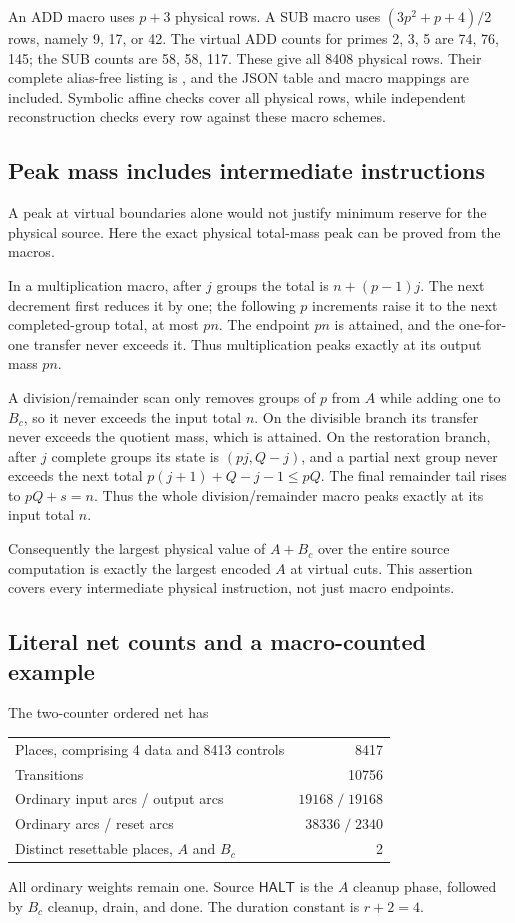\documentclass[11pt,letterpaper]{article}
\theoremstyle{definition}
\theoremstyle{remark}
\newcommand{\HALT}{\mathsf{HALT}}
\begin{document}
An ADD macro uses $p+3$ physical rows. A SUB macro uses $(3p^2+p+4)/2$ rows, namely 9, 17, or 42. The virtual ADD counts for primes 2, 3, 5 are 74, 76, 145; the SUB counts are 58, 58, 117. These give all 8408 physical rows. Their complete alias-free listing is , and the JSON table and macro mappings are included. Symbolic affine checks cover all physical rows, while independent reconstruction checks every row against these macro schemes.

\subsection{Peak mass includes intermediate instructions}
A peak at virtual boundaries alone would not justify minimum reserve for the physical source. Here the exact physical total-mass peak can be proved from the macros.

In a multiplication macro, after $j$ groups the total is $n+(p-1)j$. The next decrement first reduces it by one; the following $p$ increments raise it to the next completed-group total, at most $pn$. The endpoint $pn$ is attained, and the one-for-one transfer never exceeds it. Thus multiplication peaks exactly at its output mass $pn$.

A division/remainder scan only removes groups of $p$ from $A$ while adding one to $B_c$, so it never exceeds the input total $n$. On the divisible branch its transfer never exceeds the quotient mass, which is attained. On the restoration branch, after $j$ complete groups its state is $(pj,Q-j)$, and a partial next group never exceeds the next total $p(j+1)+Q-j-1\leq pQ$. The final remainder tail rises to $pQ+s=n$. Thus the whole division/remainder macro peaks exactly at its input total $n$.

Consequently the largest physical value of $A+B_c$ over the entire source computation is exactly the largest encoded $A$ at virtual cuts. This assertion covers every intermediate physical instruction, not just macro endpoints.

\subsection{Literal net counts and a macro-counted example}
The two-counter ordered net has
\begin{center}
\begin{tabular}{lr}
\toprule
Places, comprising 4 data and 8413 controls & 8417\\
Transitions & 10756\\
Ordinary input arcs / output arcs & $19168\;/\;19168$\\
Ordinary arcs / reset arcs & $38336\;/\;2340$\\
Distinct resettable places, $A$ and $B_c$ & 2\\\bottomrule
\end{tabular}
\end{center}
All ordinary weights remain one. Source $\HALT$ is the $A$ cleanup phase, followed by $B_c$ cleanup, drain, and done. The duration constant is $r+2=4$.
\end{document}
